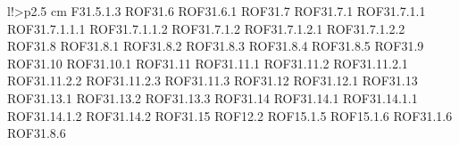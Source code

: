 \begin{tabella}{l!{\VRule}>{\centering\arraybackslash}p{2.5 cm}}
F31.5.1.3 \linebreak ROF31.6 \linebreak ROF31.6.1 \linebreak ROF31.7 \linebreak ROF31.7.1 \linebreak ROF31.7.1.1 \linebreak ROF31.7.1.1.1 \linebreak ROF31.7.1.1.2 \linebreak ROF31.7.1.2 \linebreak ROF31.7.1.2.1 \linebreak ROF31.7.1.2.2 \linebreak ROF31.8 \linebreak ROF31.8.1 \linebreak ROF31.8.2 \linebreak ROF31.8.3 \linebreak ROF31.8.4 \linebreak ROF31.8.5 \linebreak ROF31.9 \linebreak ROF31.10 \linebreak ROF31.10.1 \linebreak ROF31.11 \linebreak ROF31.11.1 \linebreak ROF31.11.2 \linebreak ROF31.11.2.1 \linebreak ROF31.11.2.2 \linebreak ROF31.11.2.3 \linebreak ROF31.11.3 \linebreak ROF31.12 \linebreak ROF31.12.1 \linebreak ROF31.13 \linebreak ROF31.13.1 \linebreak ROF31.13.2 \linebreak ROF31.13.3 \linebreak ROF31.14 \linebreak ROF31.14.1 \linebreak ROF31.14.1.1 \linebreak ROF31.14.1.2 \linebreak ROF31.14.2 \linebreak ROF31.15 \linebreak ROF12.2 \linebreak ROF15.1.5 \linebreak ROF15.1.6 \linebreak ROF31.1.6 \linebreak ROF31.8.6 \\

\end{tabella}
